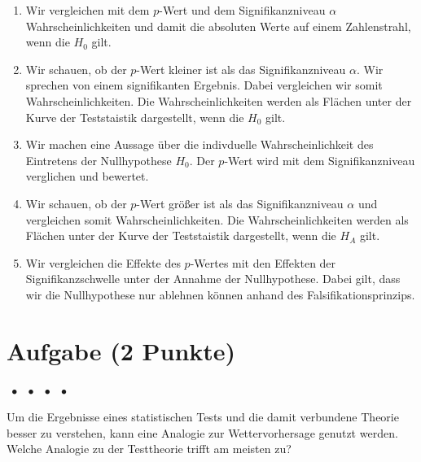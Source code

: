 \documentclass[a4paper, 9pt]{scrartcl}\usepackage[]{graphicx}\usepackage[]{xcolor}
\begin{document}
\begin{enumerate}
\item [\textbf{A} \msquare] Wir vergleichen mit dem $p$-Wert und dem Signifikanzniveau $\alpha$ Wahrscheinlichkeiten und damit die absoluten Werte auf einem Zahlenstrahl, wenn die $H_0$ gilt.
\item [\textbf{B} \msquare] Wir schauen, ob der $p$-Wert kleiner ist als das Signifikanzniveau $\alpha$. Wir sprechen von einem signifikanten Ergebnis. Dabei vergleichen wir somit Wahrscheinlichkeiten. Die Wahrscheinlichkeiten werden als Flächen unter der Kurve der Teststaistik dargestellt, wenn die $H_0$ gilt.
\item [\textbf{C} \msquare] Wir machen eine Aussage über die indivduelle Wahrscheinlichkeit des Eintretens der Nullhypothese $H_0$. Der $p$-Wert wird mit dem Signifikanzniveau verglichen und bewertet.
\item [\textbf{D} \msquare] Wir schauen, ob der $p$-Wert größer ist als das Signifikanzniveau $\alpha$ und vergleichen somit Wahrscheinlichkeiten. Die Wahrscheinlichkeiten werden als Flächen unter der Kurve der Teststaistik dargestellt, wenn die $H_A$ gilt.
\item [\textbf{E} \msquare] Wir vergleichen die Effekte des $p$-Wertes mit den Effekten der Signifikanzschwelle unter der Annahme der Nullhypothese. Dabei gilt, dass wir die Nullhypothese nur ablehnen können anhand des Falsifikationsprinzips.
\end{enumerate}

\section{Aufgabe \hfill (2 Punkte)}

\ifcollection
\begin{flushright}
\tiny\vspace{-2Ex}
\textbf{\examinhaltstart}
\exammodulemathstat $\;\bullet$
\exammodulestat $\;\bullet$
\exammodulestatbbv $\;\bullet$
\exammodulestatversuch $\;\bullet$
\exammodulebiostat
\vspace{-1Ex}
\end{flushright}
\fi




Um die Ergebnisse eines statistischen Tests und die damit verbundene Theorie besser zu verstehen, kann eine Analogie zur Wettervorhersage genutzt werden. Welche Analogie zu der Testtheorie trifft am meisten zu?
\end{document}
